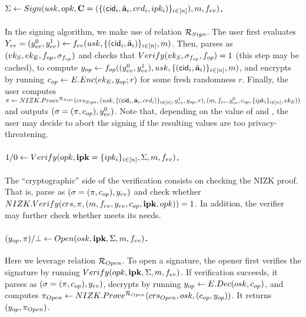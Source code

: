 \paragraph{$\Sigma \gets Sign(usk,opk,
  \mathbf{C}=(\lbrace (\mathsf{cid}_i,\tilde{\mathbf{a}}_i,crd_i,ipk_i)\rbrace_{i\in[n]}),
  m,f_{ev})$.} %
In the signing algorithm, we make use of relation $\mathcal{R}_{Sign}$.
% 
The user first evaluates $Y_{ev} = (y_{ev}^0,y_{ev}^1) \gets f_{ev} (usk,
\lbrace(\mathsf{cid}_i,\tilde{\mathbf{a}}_i)\rbrace_{i\in[n]},m)$.
Then, parses \opk as $(vk_{S},ek_{E},f_{op},\sigma_{f_{op}})$ and checks that
$Verify(vk_{S},\sigma_{f_{op}},f_{op}) = 1$
(this step may be cached), to compute $y_{op} \gets f_{op}((y_{ev}^0,
y_{ev}^1),usk,\lbrace(\mathsf{cid}_i,\tilde{\mathbf{a}}_i)\rbrace_{i\in[n]},m)$, and encrypts
\yinsp by running $c_{op} \gets E.Enc(ek_{E},y_{op}; r)$ for some fresh randomness
$r$. Finally, the user
computes $\pi \gets NIZK.Prove^{\mathcal{R}_{Sign}}(crs_{Sign},(usk,
\lbrace(\mathsf{cid}_i,\tilde{\mathbf{a}}_i,crd_i)\rbrace_{i\in[n]},y_{ev}^1,y_{op},r),(m,
f_{ev},y_{ev}^0,c_{op},\lbrace ipk_i\rbrace_{i\in[n]},ek_{E}))$ and outputs
$(\sigma = (\pi,c_{op}),y_{ev}^0)$. Note that, depending on the value of
\Yeval and \yinsp, the user may decide to abort
the signing if the resulting values are too privacy-threatening.

\paragraph{$1/0 \gets Verify(opk,\mathbf{ipk}=\lbrace ipk_i\rbrace_{i\in[n]},
  \Sigma,m,f_{ev})$.} %
The ``cryptographic'' side of the verification consists on checking
the NIZK proof. That is, parse \Sig as $(\sigma = (\pi,c_{op}),y_{ev})$ and
check whether $NIZK.Verify(crs,\pi,(m,f_{ev},y_{ev},
c_{op},\mathbf{ipk},opk)) = 1$. In addition, the verifier may further check
whether \yeval meets its needs.

\paragraph{$(y_{op},\pi)/\bot \gets
  Open(osk,\mathbf{ipk},\Sigma,m,f_{ev})$.} %
Here we leverage relation $\mathcal{R}_{Open}$.
%
To open a signature, the opener first verifies the signature by running $Verify
(opk,\mathbf{ipk}, \Sigma,m,f_{ev})$. If verification succeeds, it parses
\Sig as $(\sigma=(\pi,c_{op}),y_{ev})$, decrypts \Ec by running $y_{op}
\gets E.Dec(osk,c_{op})$, and computes $\pi_{Open} \gets
NIZK.Prove^{\mathcal{R}_{Open}}(crs_{Open},osk,(c_{op},y_{op}))$. It
returns $(y_{op},\pi_{Open})$.

